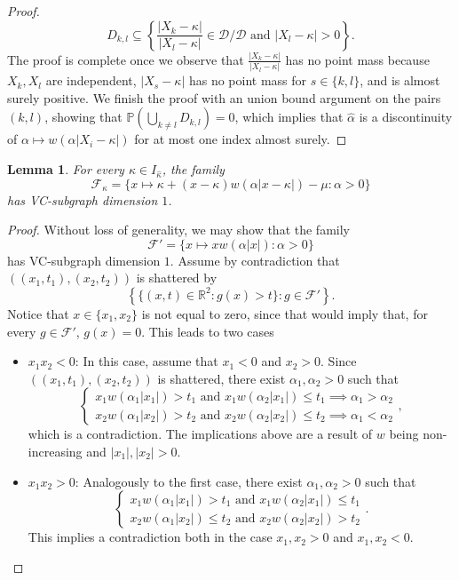 \documentclass{article}
\theoremstyle{plain}
\newtheorem{lemma}[theorem]{Lemma}
\theoremstyle{definition}
\def\R{\mathbb{R}} %
\renewcommand{\Pr}{\mathbb{P}}
\def\sD{\mathcal{D}}\def\sE{\mathcal{E}}\def\sF{\mathcal{F}}
\begin{document}
\begin{appendix}
\begin{proof}
\[D_{k,l}\subseteq\left\{\frac{\lvert  X_k-\kappa\rvert }{\lvert  X_l-\kappa\rvert }\in\sD/\sD\text{ and } \lvert  X_l-\kappa\rvert >0\right\}.
\]
The proof is complete once we observe that $\frac{\lvert  X_k-\kappa\rvert }{\lvert  X_l-\kappa\rvert }$ has no point mass because \( X_k,X_l \) are independent, $\lvert  X_s-\kappa\rvert $ has no point mass for \( s\in \{k,l\} \), and is almost surely positive. We finish the proof with an union bound argument on the pairs \( (k,l) \), showing that $\Pr(\bigcup_{k\neq l} D_{k,l})=0$, which implies that $\widehat{\alpha}$ is a discontinuity of $\alpha\mapsto w(\alpha \lvert  X_i-\kappa\rvert )$ for at most one index almost surely.
	\end{proof}
\begin{lemma}
    \label{lemma:bound_vc_dim} For every $\kappa \in I_{\widehat{\kappa}}$, the family
    \[ \sF_\kappa = \{ x \mapsto \kappa + (x-\kappa)w(\alpha \lvert  x-\kappa\rvert ) - \mu : \alpha>0   \} \]
    has VC-subgraph dimension $1$.
\end{lemma}

\begin{proof}
  Without loss of generality, we may show that the family \[\sF'= \{ x \mapsto  xw(\alpha \lvert  x\rvert ) : \alpha>0  \}\] has VC-subgraph dimension $1$. Assume by contradiction that $((x_1,t_1),(x_2,t_2))$ is shattered by
\[
\left\{\{(x,t)\in \R^2: g(x)>t\}:g\in\sF'\right\}.
\]
Notice that $x\in\{x_1,x_2\}$ is not equal to zero, since that would imply that, for every $g\in\sF'$, $g(x)=0$. This leads to two cases 
\begin{itemize}
    \item $x_1x_2<0$:
    In this case, assume that $x_1<0$ and $x_2>0$. Since $((x_1,t_1),(x_2,t_2))$ is shattered, there exist $\alpha_1,\alpha_2>0$ such that
    \[
    \begin{cases}
        x_1w(\alpha_1 \lvert x_1 \rvert )>t_1\text{ and } x_1w(\alpha_2\lvert x_1 \rvert  )\leq t_1 \implies \alpha_1>\alpha_2\\
        x_2w(\alpha_1 \lvert x_2 \rvert )>t_2\text{ and } x_2w(\alpha_2 \lvert x_2 \rvert )\leq t_2 \implies \alpha_1<\alpha_2
    \end{cases},
    \]
    which is a contradiction. The implications above are a result of $w$ being non-increasing and $\lvert  x_1\rvert ,\lvert  x_2\rvert >0$.
    \item $x_1x_2>0$: Analogously to the first case, there exist $\alpha_1,\alpha_2>0$ such that
    \[
        \begin{cases}
        x_1w(\alpha_1 \lvert x_1 \rvert )>t_1\text{ and } x_1w(\alpha_2 \lvert x_1 \rvert )\leq t_1\\
        x_2w(\alpha_1 \lvert x_2 \rvert )\leq t_2\text{ and } x_2w(\alpha_2 \lvert x_2 \rvert )> t_2 
    \end{cases}.
    \]
    This implies a contradiction both in the case $x_1,x_2>0$ and $x_1,x_2<0$.\qedhere
\end{itemize}
\end{proof}


\end{appendix}
\end{document}

